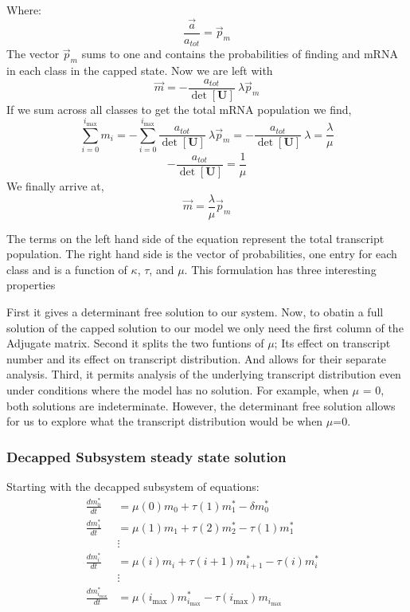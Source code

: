 \documentclass[review]{elsarticle}
\newcommand{\imax}{\ensuremath{{i_{\max}}}\xspace}
\let\bs\boldsymbol
\begin{document}
Where:
	\begin{equation*}
		\frac{\vec{a}}{a_{tot}} = \vec{p}_m
	\end{equation*}
The vector $\vec{p}_m$ sums to one and contains the probabilities of finding and mRNA in each class in the capped state. Now we are left with
	\begin{equation*}
		\vec{m}=-\frac{a_{tot}}{\det[\bs{U}]} \: \lambda\vec{p}_m
	\end{equation*}
If we sum across all classes to get the total mRNA population we find,
	\begin{equation*}
		\sum_{i=0}^{\imax}m_{i} =-\sum_{i=0}^{\imax} \frac{a_{tot}}{\det[\bs{U}]} \: \lambda\vec{p}_m =-\frac{a_{tot}}{\det[\bs{U}]} \: \lambda = \frac{\lambda}{\mu}
	\end{equation*}
	\begin{equation*}
		-\frac{a_{tot}}{\det[\bs{U}]} = \frac{1}{\mu}
	\end{equation*}
We finally arrive at,
	\begin{equation} 
		\vec{m}=\frac{\lambda}{\mu}\vec{p}_m
	\end{equation}


The terms on the left hand side of the equation represent the total transcript population. The right hand side is the vector of probabilities, one entry for each class and is a function of $\kappa$, $\tau$, and $\mu$.
This formulation has three interesting properties

First it gives a determinant free solution to our system. Now, to obatin a full solution of the capped solution to our model we only need the first column of the Adjugate matrix.
Second it splits the two funtions of $\mu$; Its effect on transcript number and its effect on transcript distribution. And allows for their separate analysis.
Third, it permits analysis of the underlying transcript distribution even under conditions where the model has no solution. For example, when $\mu$ = 0, both solutions are indeterminate. However, the determinant free solution allows for us to explore what the transcript distribution would be when $\mu$=0.
	

\subsubsection{Decapped Subsystem steady state solution}

Starting with the decapped subsystem of equations:
\begin{align*}
\frac{dm_{0}^{*}}{dt} &= \mu(0)m_{0}+\tau(1)m_{1}^{*}-\delta m_{0}^{*} \\
\frac{dm_{1}^{*}}{dt} &= \mu(1)m_{1}+\tau(2)m_{2}^{*}-\tau(1)m_{1}^{*} \\
& \vdots & \\
\frac{dm_{i}^{*}}{dt} &= \mu(i)m_{i}+\tau(i+1)m_{i+1}^{*}-\tau(i)m_{i}^{*} \\
& \vdots & \\
\frac{dm_{\imax}^{*}}{dt} &= \mu(\imax)m_{\imax}^{*}-\tau(\imax)m_{\imax} \\
\end{align*}
\end{document}
